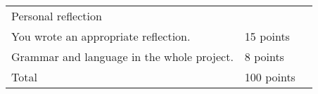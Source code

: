 \documentclass[12pt]{article}
\begin{document}
\begin{tabular}{|p{4in}|p{1.25in}||p{1.05in}|}
\hline
Personal reflection & & \\
\hspace{0.25in} You wrote an appropriate reflection. & 15 points &\underline{\hspace{1in}}\\
\hspace{0.25in} Grammar and language in the whole project. & 8 points & \underline{\hspace{1in}}\\
\hline

Total  & 100 points &\underline{\hspace{1in}}\\
\hline
\end{tabular}
\end{document}
